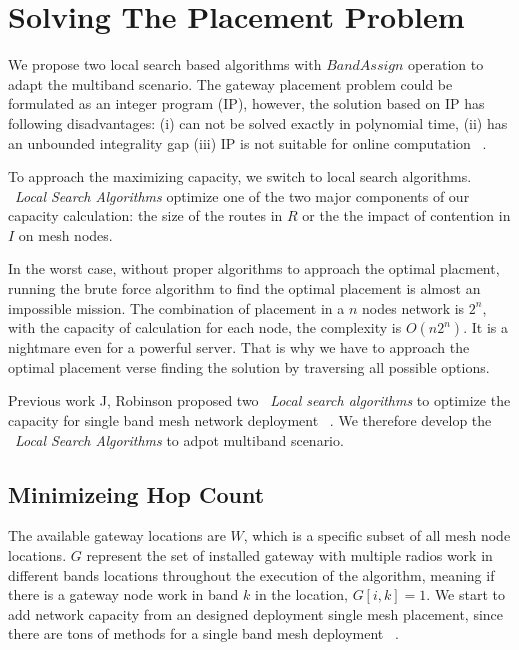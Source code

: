 \section{Solving The Placement Problem}
\label{sec:algorithms}

We propose two local search based algorithms with $Band Assign$ operation to adapt the multiband scenario. The gateway placement problem could be formulated as an integer program (IP), however, the solution based on IP has following disadvantages: (i) can not be solved exactly in polynomial time,
   (ii) has an unbounded integrality gap
   (iii) IP is not suitable for online computation ~\cite{robinson2008adding}.

   To approach the maximizing capacity, we switch to local search algorithms.
   ~\emph{Local Search Algorithms} optimize one of the two major components of our capacity calculation: the size of the routes in $R$ or the the impact of contention in $I$ on mesh nodes.

In the worst case, without proper algorithms to approach the optimal placment, running the brute force algorithm to find the optimal placement is almost an impossible mission. The combination of placement in a $n$ nodes network is $2^n$, with the capacity of calculation for each node, the complexity is $O(n2^n)$. It is a nightmare even for a powerful server. That is why we have to approach the optimal placement verse finding the solution by traversing all possible options.

   Previous work J, Robinson proposed two ~\emph{Local search algorithms} to optimize the capacity for single band mesh network deployment ~\cite{robinson2008adding}. 
   We therefore develop the ~\emph{Local Search Algorithms} to adpot multiband scenario.

   \subsection{Minimizeing Hop Count}

   The available gateway locations are $W$, which is a specific subset of all mesh node locations. $G$ represent the set of installed gateway with multiple radios work in different bands locations throughout the execution of the algorithm, meaning if there is a gateway node work in band $k$ in the location, $G[i,k]=1$.
   We start to add network capacity from an designed deployment single mesh placement, since there are tons of methods for a single band mesh deployment ~\cite{akyildiz2005wireless}.


